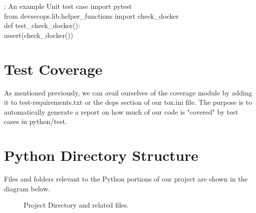 \begin{mybox}{\thetcbcounter: An example Unit test case}
  import pytest\\
  from devsecops.lib.helper\_functions import check\_docker\\

  def test\_check\_docker():\\
  assert(check\_docker())
\end{mybox}

\section{Test Coverage}

\justify
As mentioned previously, we can avail ourselves of the coverage module by adding it to test-requirements.txt or the deps section of our tox.ini file. The purpose is to automatically generate a report on how much of
our code is "covered" by test cases in python/test.

\section{Python Directory Structure}

Files and folders relevant to the Python portions of our project are shown in the diagram below.

\begin{figure}[!htb]
  \centering
  
  \caption{Project Directory and related files.}
\end{figure}


